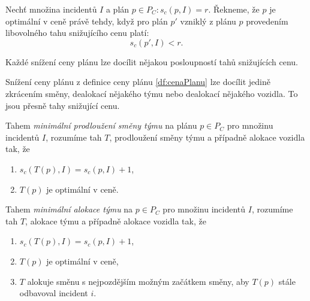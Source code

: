 \begin{definice}
  Nechť množina incidentů $I$ a plán $p \in P_C \colon s_c(p, I) = r$.
  Řekneme, že $p$ je optimální v ceně právě tehdy, když
  pro plán $p'$ vzniklý z plánu $p$ provedením libovolného tahu snižujícího cenu platí: 
  \begin{equation*}
    s_c(p', I) < r.
  \end{equation*}
\end{definice}

\begin{veta}\label{veta:kazdeSnizeniCenyJeInv}
  Každé snížení ceny plánu lze docílit nějakou posloupností tahů snižujících cenu.
\end{veta}
\begin{dukaz}
  Snížení ceny plánu z definice ceny plánu \ref{df:cenaPlanu} lze docílit jedině zkrácením směny,
  dealokací nějakého týmu nebo dealokací nějakého vozidla.
  To jsou přesně tahy snižující cenu.
\end{dukaz}


\begin{definice}
  Tahem \textit{minimální prodloužení směny týmu} na plánu $p \in P_C$ pro množinu incidentů $I$, rozumíme tah $T$, prodloužení směny týmu a případně alokace vozidla tak, že
  \begin{enumerate}
    \item
      $s_c(T(p), I) = s_c(p, I) + 1$,
    \item
      $T(p)$ je optimální v ceně.
  \end{enumerate}
\end{definice}

\begin{definice}
  Tahem \textit{minimální alokace týmu} na $p \in P_C$ pro množinu incidentů $I$, rozumíme tah $T$, alokace týmu a případně alokace vozidla tak, že
  \begin{enumerate}
    \item
      $s_c(T(p), I) = s_c(p, I) + 1$,

    \item
      $T(p)$ je optimální v ceně,


    \item
      $T$ alokuje směnu s nejpozdějším možným začátkem směny, aby $T(p)$ stále odbavoval incident $i$. 
  \end{enumerate}
\end{definice}

